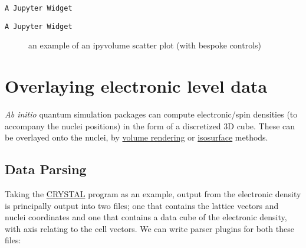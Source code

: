 \documentclass[10pt,parskip=half,
	toc=sectionentrywithdots,
	bibliography=totocnumbered,
	captions=tableheading,numbers=noendperiod]{scrartcl}
\begin{document}
\begin{lstlisting}[language={},postbreak={},numbers=none,xrightmargin=7pt,breakindent=0pt,aboveskip=5pt,belowskip=5pt]
A Jupyter Widget
\end{lstlisting}

\begin{lstlisting}[language={},postbreak={},numbers=none,xrightmargin=7pt,breakindent=0pt,aboveskip=5pt,belowskip=5pt]
A Jupyter Widget
\end{lstlisting}

\begin{figure}[H]\begin{center}\end{center}\caption{an example of an ipyvolume scatter plot (with bespoke controls)}\label{fig:ipyvol2}
    \end{figure}

\section{Overlaying electronic level
data}\label{overlaying-electronic-level-data}

\emph{Ab initio} quantum simulation packages can compute electronic/spin
densities (to accompany the nuclei positions) in the form of a
discretized 3D cube. These can be overlayed onto the nuclei, by
\href{https://en.wikipedia.org/wiki/Volume_rendering}{volume rendering}
or \href{https://en.wikipedia.org/wiki/Isosurface}{isosurface} methods.

\subsection{Data Parsing}\label{data-parsing}

Taking the \href{http://www.crystal.unito.it/index.php}{CRYSTAL} program
as an example, output from the electronic density is principally output
into two files; one that contains the lattice vectors and nuclei
coordinates and one that contains a data cube of the electronic density,
with axis relating to the cell vectors. We can write parser plugins for
both these files:
\end{document}
